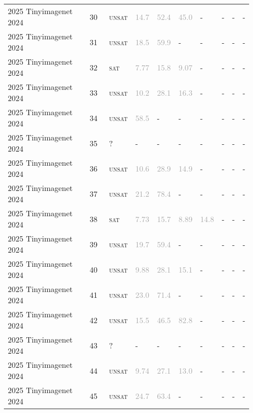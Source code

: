 \begin{center}
{\begin{longtable}{@{}llllllllll@{}}
2025 Tinyimagenet 2024 & 30 & ~\textsc{unsat} & \textcolor{darkgray}{14.7} & \textcolor{darkgray}{52.4} & \textcolor{darkgray}{45.0} & - & - & - & - \\
2025 Tinyimagenet 2024 & 31 & ~\textsc{unsat} & \textcolor{darkgray}{18.5} & \textcolor{darkgray}{59.9} & - & - & - & - & - \\
2025 Tinyimagenet 2024 & 32 & ~\textsc{sat} & \textcolor{darkgray}{7.77} & \textcolor{darkgray}{15.8} & \textcolor{darkgray}{9.07} & - & - & - & - \\
2025 Tinyimagenet 2024 & 33 & ~\textsc{unsat} & \textcolor{darkgray}{10.2} & \textcolor{darkgray}{28.1} & \textcolor{darkgray}{16.3} & - & - & - & - \\
2025 Tinyimagenet 2024 & 34 & ~\textsc{unsat} & \textcolor{darkgray}{58.5} & - & - & - & - & - & - \\
2025 Tinyimagenet 2024 & 35 & ~? & - & - & - & - & - & - & - \\
2025 Tinyimagenet 2024 & 36 & ~\textsc{unsat} & \textcolor{darkgray}{10.6} & \textcolor{darkgray}{28.9} & \textcolor{darkgray}{14.9} & - & - & - & - \\
2025 Tinyimagenet 2024 & 37 & ~\textsc{unsat} & \textcolor{darkgray}{21.2} & \textcolor{darkgray}{78.4} & - & - & - & - & - \\
2025 Tinyimagenet 2024 & 38 & ~\textsc{sat} & \textcolor{darkgray}{7.73} & \textcolor{darkgray}{15.7} & \textcolor{darkgray}{8.89} & \textcolor{darkgray}{14.8} & - & - & - \\
2025 Tinyimagenet 2024 & 39 & ~\textsc{unsat} & \textcolor{darkgray}{19.7} & \textcolor{darkgray}{59.4} & - & - & - & - & - \\
2025 Tinyimagenet 2024 & 40 & ~\textsc{unsat} & \textcolor{darkgray}{9.88} & \textcolor{darkgray}{28.1} & \textcolor{darkgray}{15.1} & - & - & - & - \\
2025 Tinyimagenet 2024 & 41 & ~\textsc{unsat} & \textcolor{darkgray}{23.0} & \textcolor{darkgray}{71.4} & - & - & - & - & - \\
2025 Tinyimagenet 2024 & 42 & ~\textsc{unsat} & \textcolor{darkgray}{15.5} & \textcolor{darkgray}{46.5} & \textcolor{darkgray}{82.8} & - & - & - & - \\
2025 Tinyimagenet 2024 & 43 & ~? & - & - & - & - & - & - & - \\
2025 Tinyimagenet 2024 & 44 & ~\textsc{unsat} & \textcolor{darkgray}{9.74} & \textcolor{darkgray}{27.1} & \textcolor{darkgray}{13.0} & - & - & - & - \\
2025 Tinyimagenet 2024 & 45 & ~\textsc{unsat} & \textcolor{darkgray}{24.7} & \textcolor{darkgray}{63.4} & - & - & - & - & - \\

\end{longtable}}
\end{center}
